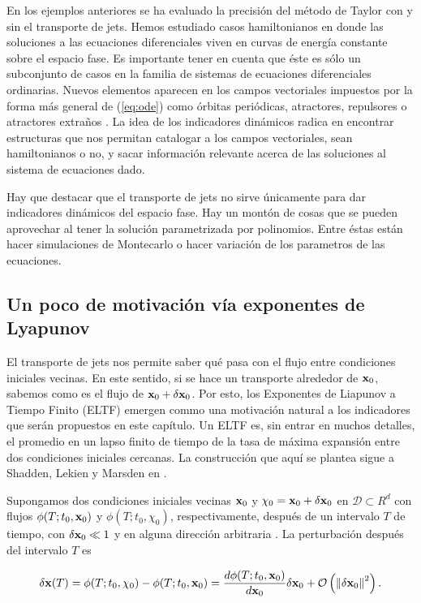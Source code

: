En los ejemplos anteriores se ha evaluado la precisión del método de Taylor con y sin el transporte de jets. Hemos estudiado casos hamiltonianos en donde las soluciones a las ecuaciones diferenciales viven en curvas de energía constante sobre el espacio fase. Es importante tener en cuenta que éste es sólo un subconjunto de casos en la familia de sistemas de ecuaciones diferenciales ordinarias. Nuevos elementos aparecen en los campos vectoriales impuestos por la forma más general de (\ref{eq:ode}) como órbitas periódicas, atractores, repulsores o atractores extraños \cite{Perez2015}. La idea de los indicadores dinámicos radica en encontrar estructuras que nos permitan catalogar a los campos vectoriales, sean hamiltonianos o no, y sacar información relevante acerca de las soluciones al sistema de ecuaciones dado. 

Hay que destacar que el transporte de jets no sirve únicamente para dar indicadores dinámicos del espacio fase. Hay un montón de cosas que se pueden aprovechar al tener la solución parametrizada por polinomios. Entre éstas están hacer simulaciones de Montecarlo o hacer variación de los parametros de las ecuaciones.

\subsection{Un poco de motivación vía exponentes de Lyapunov}
\label{sec:FTLE}

El transporte de jets nos permite saber qué pasa con el flujo entre condiciones iniciales vecinas. En este sentido, si se hace un transporte alrededor de $\mathbf{x}_0$, sabemos como es el flujo de $\mathbf{x}_0 + \delta \mathbf{x}_0$. Por esto, los Exponentes de Liapunov a Tiempo Finito (ELTF) emergen commo una motivación natural a los indicadores que serán propuestos en este capítulo. Un ELTF es, sin entrar en muchos detalles, el promedio en un lapso finito de tiempo de la tasa de máxima expansión entre dos condiciones iniciales cercanas. La construcción que aquí se plantea sigue a Shadden, Lekien y Marsden en \cite{Shadden2005}.

Supongamos dos condiciones iniciales vecinas $\mathbf{x}_0$ y $\mathbf{\chi}_0 = \mathbf{x}_0 + \delta \mathbf{x}_0$ en $\mathcal{D} \subset R^d$ con flujos $\phi(T;t_0, \mathbf{x}_0)$ y $\phi(T;t_0, \chi_0)$, respectivamente, después de un intervalo $T$ de tiempo, con $\delta \mathbf{x}_0 \ll 1$ y en alguna dirección arbitraria . La perturbación después del intervalo $T$ es

\begin{equation}
 \delta \mathbf{x}(T) = \phi(T;t_0, \chi_0) - \phi(T;t_0, \mathbf{x}_0) = \frac{d \phi(T;t_0, \mathbf{x}_0)}{d\mathbf{x}_0} \delta \mathbf{x}_0 + \mathcal{O} \left( \left\lVert \delta \mathbf{x}_0\right\rVert^2 \right).
 \label{eq:perturbation}
\end{equation}

